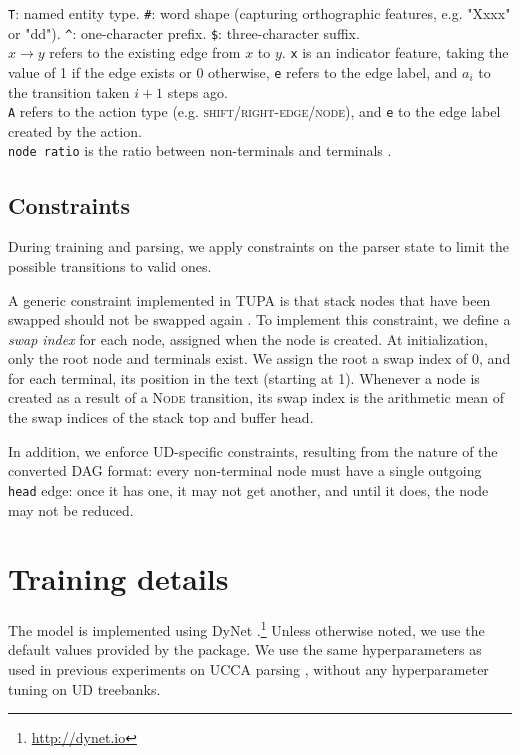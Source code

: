\documentclass[11pt,a4paper]{article}
\begin{document}
\begin{table}[h]
{\texttt{T}: named entity type.
\texttt{\#}: word shape (capturing orthographic features, e.g. "Xxxx" or "dd").
\texttt{\^{}}: one-character prefix.
\texttt{\$}: three-character suffix.\\
$x \to y$ refers to the existing edge from $x$ to $y$.
\texttt{x} is an indicator feature, taking the value of 1 if the edge exists or 0 otherwise,
\texttt{e} refers to the edge label, and
$a_i$ to the transition taken $i+1$ steps ago.\\
\texttt{A} refers to the action type (e.g. \textsc{shift}/\textsc{right-edge}/\textsc{node}), and
\texttt{e} to the edge label created by the action.\\
\texttt{node ratio} is the ratio between non-terminals and terminals \cite{hershcovich2017a}.}
\end{table}

\subsection{Constraints}\label{sec:constraints}
During training and parsing, we apply constraints on the parser state
to limit the possible transitions to valid ones.

A generic constraint implemented in TUPA is that stack nodes 
that have been swapped
should not be swapped again \cite{hershcovich2018multitask}.
 To implement this constraint, we define a \textit{swap index}
 for each node, assigned when the node is created.
 At initialization, only the root node and terminals exist.
 We assign the root a swap index of 0, and for each terminal, its
 position in the text (starting at 1).
 Whenever a node is created as a result of a \textsc{Node}
 transition, its swap index is the arithmetic
 mean of the swap indices of the stack top and buffer head.
 
In addition, we enforce UD-specific constraints, resulting from
the nature of the converted DAG format:
every non-terminal node must have a single outgoing \verb|head| edge:
once it has one, it may not get another, and
until it does, the node may not be reduced.


\section{Training details}\label{sec:details}

The model is implemented using DyNet \cite{neubig2017dynet}.\footnote{\url{http://dynet.io}}
Unless otherwise noted, we use the default values provided by the package.
We use the same hyperparameters as used in previous experiments on UCCA
parsing \cite{hershcovich2018multitask},
without any hyperparameter tuning on UD treebanks.
\end{document}
